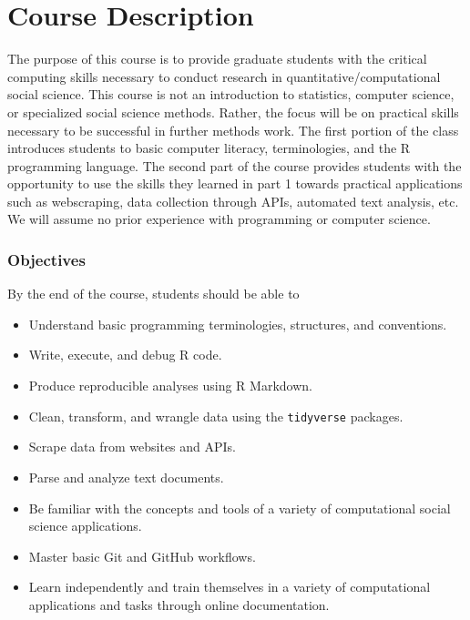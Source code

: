 \documentclass[
]{book}
\providecommand{\tightlist}{%
  \setlength{\itemsep}{0pt}\setlength{\parskip}{0pt}}
\begin{document}
\hypertarget{course-description}{%
\section{Course Description}\label{course-description}}

The purpose of this course is to provide graduate students with the critical computing skills necessary to conduct research in quantitative/computational social science. This course is not an introduction to statistics, computer science, or specialized social science methods. Rather, the focus will be on practical skills necessary to be successful in further methods work. The first portion of the class introduces students to basic computer literacy, terminologies, and the R programming language. The second part of the course provides students with the opportunity to use the skills they learned in part 1 towards practical applications such as webscraping, data collection through APIs, automated text analysis, etc. We will assume no prior experience with programming or computer science.

\hypertarget{objectives}{%
\subsubsection*{Objectives}\label{objectives}}

By the end of the course, students should be able to

\begin{itemize}
\tightlist
\item
  Understand basic programming terminologies, structures, and conventions.
\item
  Write, execute, and debug R code.
\item
  Produce reproducible analyses using R Markdown.
\item
  Clean, transform, and wrangle data using the \texttt{tidyverse} packages.
\item
  Scrape data from websites and APIs.
\item
  Parse and analyze text documents.
\item
  Be familiar with the concepts and tools of a variety of computational social science applications.
\item
  Master basic Git and GitHub workflows.
\item
  Learn independently and train themselves in a variety of computational applications and tasks through online documentation.
\end{itemize}
\end{document}
